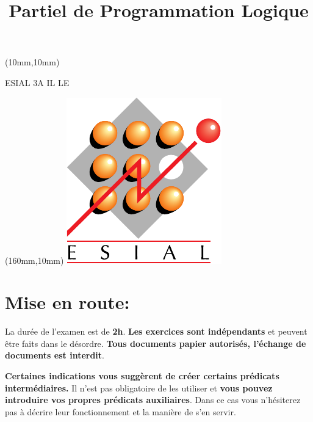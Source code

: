 \documentclass[a4paper]{article}
\title{Partiel de Programmation Logique}
\begin{document}
\maketitle
\begin{textblock*}{4cm}(10mm,10mm)
\begin{Large}ESIAL 3A IL LE\end{Large}
\end{textblock*}
\begin{textblock*}{3cm}(160mm,10mm)
\includegraphics[width=\textwidth]{../ESIAL.pdf}
\end{textblock*}

\section*{Mise en route:}

La durée de l'examen est de \textbf{2h}. \textbf{Les exercices sont
indépendants} et peuvent être faits dans le désordre. \textbf{Tous
documents papier autorisés, l'échange de documents est interdit}.

\textbf{Certaines indications vous suggèrent de créer certains prédicats
intermédiaires.} Il n'est pas obligatoire de les utiliser et \textbf{vous
pouvez introduire vos propres prédicats auxiliaires}. Dans ce cas vous 
n'hésiterez pas à décrire leur fonctionnement et la manière de s'en
servir.
\end{document}
